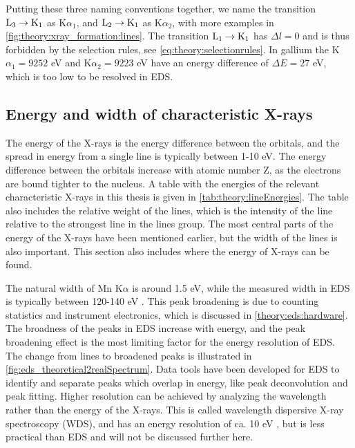 Putting these three naming conventions together, we name the transition $\textnormal{L}_3 \rightarrow \textnormal{K}_1$ as K$\alpha_1$, and $\textnormal{L}_2 \rightarrow \textnormal{K}_1$ as K$\alpha_2$, with more examples in \cref{fig:theory:xray_formation:lines}.
The transition $\textnormal{L}_1 \rightarrow \textnormal{K}_1$ has $\Delta l =  0$ and is thus forbidden by the selection rules, see \cref{eq:theory:selectionrules}.
In gallium the K$\alpha_1 = 9252$ eV and K$\alpha_2 = 9223$ eV \cite{thompson_x-ray_2004} have an energy difference of $\Delta E = 27$ eV, which is too low to be resolved in EDS.




\subsection{Energy and width of characteristic X-rays}
\label{theory:xray_formation:energy}


The energy of the X-rays is the energy difference between the orbitals, and the spread in energy from a single line is typically between 1-10 eV.
The energy difference between the orbitals increase with atomic number Z, as the electrons are bound tighter to the nucleus.
A table with the energies of the relevant characteristic X-rays in this thesis is given in \cref{tab:theory:lineEnergies}.
The table also includes the relative weight of the lines, which is the intensity of the line relative to the strongest line in the lines group.
The most central parts of the energy of the X-rays have been mentioned earlier, but the width of the lines is also important.
This section also includes where the energy of X-rays can be found.


The natural width of Mn K$\alpha$ is around 1.5 eV, while the measured width in EDS is typically between 120-140 eV \cite[Ch. 16.1.1]{goldstein_scanning_2018}.
This peak broadening is due to counting statistics and instrument electronics, which is discussed in \cref{theory:eds:hardware}.
The broadness of the peaks in EDS increase with energy, and the peak broadening effect is the most limiting factor for the energy resolution of EDS.
The change from lines to broadened peaks is illustrated in \cref{fig:eds_theoretical2realSpectrum}.
Data tools have been developed for EDS to identify and separate peaks which overlap in energy, like peak deconvolution and peak fitting.
Higher resolution can be achieved by analyzing the wavelength rather than the energy of the X-rays.
This is called wavelength dispersive X-ray spectroscopy (WDS), and has an energy resolution of ca. 10 eV \cite{goldstein_scanning_2018}, but is less practical than EDS and will not be discussed further here.


